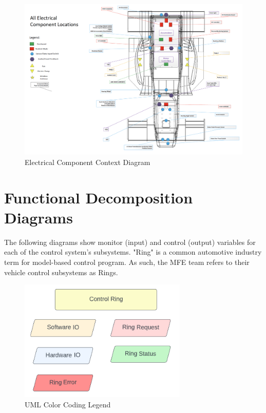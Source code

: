 \documentclass[12pt]{article}
\begin{document}
\begin{figure}[htp]
    \centering
    \includegraphics[width=15cm]{electrical_components.png}
    \caption{Electrical Component Context Diagram}
    \label{fig:electrical_component}
\end{figure}

\newpage
\section{Functional Decomposition Diagrams}

The following diagrams show monitor (input) and control (output) variables for each of the control system's subsystems. "Ring" is a common automotive industry term for model-based control program. As such, the MFE team refers to their vehicle control subsystems as Rings.\\

\noindent
\begin{figure}[htp]
    \centering
    \includegraphics[width=8cm]{uml_legend.png}
    \caption{UML Color Coding Legend}
    \label{fig:uml_legend}
\end{figure}
\end{document}
